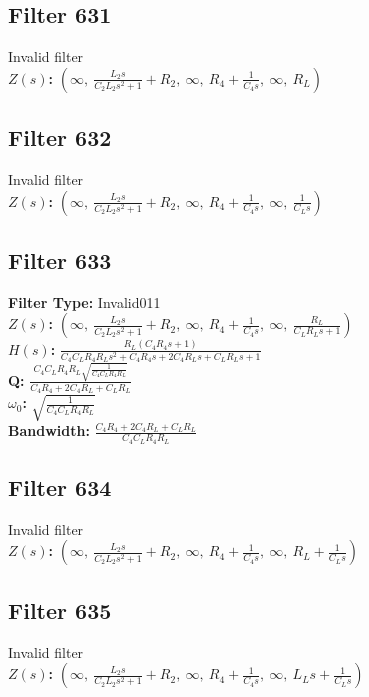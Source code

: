\documentclass{article}
\begin{document}
\subsection*{Filter 631}
Invalid filter \\ 
\textbf{$Z(s)$:} $\left( \infty, \  \frac{L_{2} s}{C_{2} L_{2} s^{2} + 1} + R_{2}, \  \infty, \  R_{4} + \frac{1}{C_{4} s}, \  \infty, \  R_{L}\right)$ \\ 
\subsection*{Filter 632}
Invalid filter \\ 
\textbf{$Z(s)$:} $\left( \infty, \  \frac{L_{2} s}{C_{2} L_{2} s^{2} + 1} + R_{2}, \  \infty, \  R_{4} + \frac{1}{C_{4} s}, \  \infty, \  \frac{1}{C_{L} s}\right)$ \\ 
\subsection*{Filter 633}
\textbf{Filter Type:} Invalid011 \\ 
\textbf{$Z(s)$:} $\left( \infty, \  \frac{L_{2} s}{C_{2} L_{2} s^{2} + 1} + R_{2}, \  \infty, \  R_{4} + \frac{1}{C_{4} s}, \  \infty, \  \frac{R_{L}}{C_{L} R_{L} s + 1}\right)$ \\ 
\textbf{$H(s)$:} $\frac{R_{L} \left(C_{4} R_{4} s + 1\right)}{C_{4} C_{L} R_{4} R_{L} s^{2} + C_{4} R_{4} s + 2 C_{4} R_{L} s + C_{L} R_{L} s + 1}$ \\ 
\textbf{Q:} $\frac{C_{4} C_{L} R_{4} R_{L} \sqrt{\frac{1}{C_{4} C_{L} R_{4} R_{L}}}}{C_{4} R_{4} + 2 C_{4} R_{L} + C_{L} R_{L}}$ \\ 
\textbf{$\omega_0$:} $\sqrt{\frac{1}{C_{4} C_{L} R_{4} R_{L}}}$ \\ 
\textbf{Bandwidth:} $\frac{C_{4} R_{4} + 2 C_{4} R_{L} + C_{L} R_{L}}{C_{4} C_{L} R_{4} R_{L}}$ \\ 
\subsection*{Filter 634}
Invalid filter \\ 
\textbf{$Z(s)$:} $\left( \infty, \  \frac{L_{2} s}{C_{2} L_{2} s^{2} + 1} + R_{2}, \  \infty, \  R_{4} + \frac{1}{C_{4} s}, \  \infty, \  R_{L} + \frac{1}{C_{L} s}\right)$ \\ 
\subsection*{Filter 635}
Invalid filter \\ 
\textbf{$Z(s)$:} $\left( \infty, \  \frac{L_{2} s}{C_{2} L_{2} s^{2} + 1} + R_{2}, \  \infty, \  R_{4} + \frac{1}{C_{4} s}, \  \infty, \  L_{L} s + \frac{1}{C_{L} s}\right)$ \\ 
\end{document}
